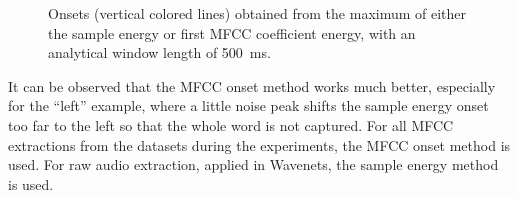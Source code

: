 \begin{figure}[!ht]
  \centering
  \caption{Onsets (vertical colored lines) obtained from the maximum of either the sample energy or first MFCC coefficient energy, with an analytical window length of \SI{500}{\milli\second}.}
  \label{fig:signal_onset_showcase}
\end{figure}
\FloatBarrier
\noindent
It can be observed that the MFCC onset method works much better, especially for the \enquote{left} example, where a little noise peak shifts the sample energy onset too far to the left so that the whole word is not captured.
For all MFCC extractions from the datasets during the experiments, the MFCC onset method is used. 
For raw audio extraction, applied in Wavenets, the sample energy method is used.


